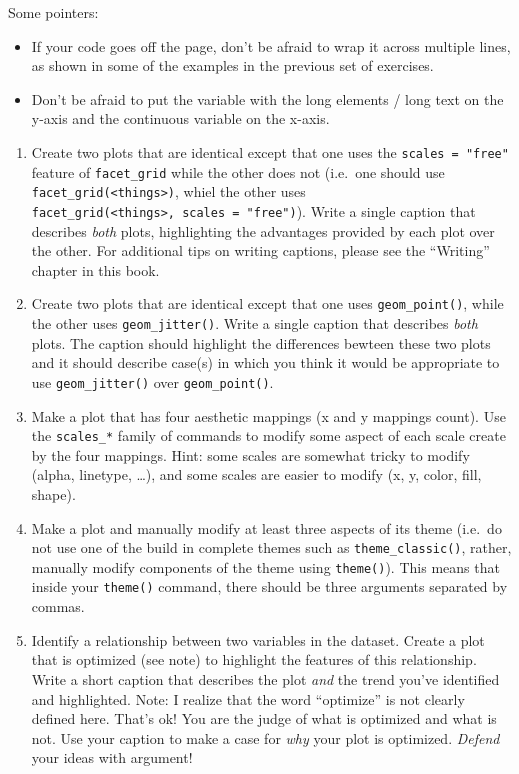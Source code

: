 \documentclass[
]{krantz}
\begin{document}
Some pointers:

\begin{itemize}
\item
  If your code goes off the page, don't be afraid to wrap it across multiple lines, as shown in some of the examples in the previous set of exercises.
\item
  Don't be afraid to put the variable with the long elements / long text on the y-axis and the continuous variable on the x-axis.
\end{itemize}

\begin{enumerate}
\def\labelenumi{\arabic{enumi}.}
\item
  Create two plots that are identical except that one uses the \texttt{scales\ =\ "free"} feature of \texttt{facet\_grid} while the other does not (i.e.~one should use \texttt{facet\_grid(\textless{}things\textgreater{})}, whiel the other uses \texttt{facet\_grid(\textless{}things\textgreater{},\ scales\ =\ "free")}). Write a single caption that describes \emph{both} plots, highlighting the advantages provided by each plot over the other. For additional tips on writing captions, please see the ``Writing'' chapter in this book.
\item
  Create two plots that are identical except that one uses \texttt{geom\_point()}, while the other uses \texttt{geom\_jitter()}. Write a single caption that describes \emph{both} plots. The caption should highlight the differences bewteen these two plots and it should describe case(s) in which you think it would be appropriate to use \texttt{geom\_jitter()} over \texttt{geom\_point()}.
\item
  Make a plot that has four aesthetic mappings (x and y mappings count). Use the \texttt{scales\_*} family of commands to modify some aspect of each scale create by the four mappings. Hint: some scales are somewhat tricky to modify (alpha, linetype, \ldots), and some scales are easier to modify (x, y, color, fill, shape).
\item
  Make a plot and manually modify at least three aspects of its theme (i.e.~do not use one of the build in complete themes such as \texttt{theme\_classic()}, rather, manually modify components of the theme using \texttt{theme()}). This means that inside your \texttt{theme()} command, there should be three arguments separated by commas.
\item
  Identify a relationship between two variables in the dataset. Create a plot that is optimized (see note) to highlight the features of this relationship. Write a short caption that describes the plot \emph{and} the trend you've identified and highlighted. Note: I realize that the word ``optimize'' is not clearly defined here. That's ok! You are the judge of what is optimized and what is not. Use your caption to make a case for \emph{why} your plot is optimized. \emph{Defend} your ideas with argument!
\end{enumerate}
\end{document}
